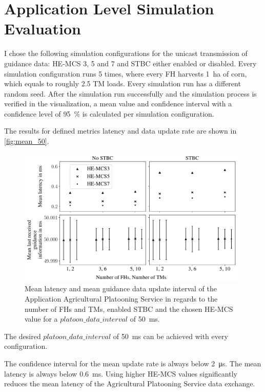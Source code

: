 \section{Application Level Simulation Evaluation}
I chose the following simulation configurations for the unicast transmission of guidance data: \ac{HE}-\ac{MCS} 3, 5 and 7 and
\ac{STBC} either enabled or disabled.
Every simulation configuration runs \num{5} times, where every \ac{FH} harvests \SI{1}{\hectare} of corn, which equals to roughly
\num{2.5} \ac{TM} loads.
Every simulation run has a different random seed.
After the simulation run successfully and the simulation process is verified in the visualization,
a mean value and confidence interval with a confidence level of
\SI{95}{\percent} is calculated per simulation configuration.

The results for defined metrics latency and data update rate are shown in \autoref{fig:mean_50}.


\begin{figure}[]%
	\centering
	\includegraphics[width=0.98\textwidth]{Latex/figures/latency_lastUpdate50ms}
	\caption{Mean latency and mean guidance data update interval of the Application Agricultural Platooning Service
	in regards to the number of \acfp{FH} and \acfp{TM}, enabled \acf{STBC} and
	the chosen \ac{HE}-\ac{MCS} value for a $platoon\_data\_interval$ of \SI{50}{\milli\second}.}
	\label{fig:mean_50}%
\end{figure}

The desired $platoon\_data\_interval$ of \SI{50}{\milli\second} can be achieved with every
configuration.

The confidence interval for the mean update rate is always below \SI{2}{\micro\second}.
The mean latency is always below \SI{0.6}{\milli\second}.
Using higher \ac{HE}-\ac{MCS} values significantly reduces the mean latency of
the Agricultural Platooning Service data exchange.

